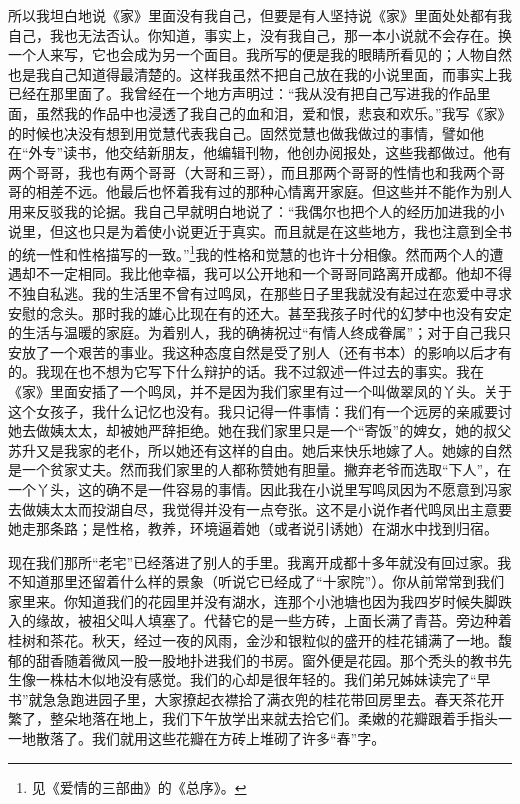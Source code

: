 \par 所以我坦白地说《家》里面没有我自己，但要是有人坚持说《家》里面处处都有我自己，我也无法否认。你知道，事实上，没有我自己，那一本小说就不会存在。换一个人来写，它也会成为另一个面目。我所写的便是我的眼睛所看见的；人物自然也是我自己知道得最清楚的。这样我虽然不把自己放在我的小说里面，而事实上我已经在那里面了。我曾经在一个地方声明过：“我从没有把自己写进我的作品里面，虽然我的作品中也浸透了我自己的血和泪，爱和恨，悲哀和欢乐。”我写《家》的时候也决没有想到用觉慧代表我自己。固然觉慧也做我做过的事情，譬如他在“外专”读书，他交结新朋友，他编辑刊物，他创办阅报处，这些我都做过。他有两个哥哥，我也有两个哥哥（大哥和三哥），而且那两个哥哥的性情也和我两个哥哥的相差不远。他最后也怀着我有过的那种心情离开家庭。但这些并不能作为别人用来反驳我的论据。我自己早就明白地说了：“我偶尔也把个人的经历加进我的小说里，但这也只是为着使小说更近于真实。而且就是在这些地方，我也注意到全书的统一性和性格描写的一致。”\footnote{见《爱情的三部曲》的《总序》。}我的性格和觉慧的也许十分相像。然而两个人的遭遇却不一定相同。我比他幸福，我可以公开地和一个哥哥同路离开成都。他却不得不独自私逃。我的生活里不曾有过鸣凤，在那些日子里我就没有起过在恋爱中寻求安慰的念头。那时我的雄心比现在有的还大。甚至我孩子时代的幻梦中也没有安定的生活与温暖的家庭。为着别人，我的确祷祝过“有情人终成眷属”；对于自己我只安放了一个艰苦的事业。我这种态度自然是受了别人（还有书本）的影响以后才有的。我现在也不想为它写下什么辩护的话。我不过叙述一件过去的事实。我在《家》里面安插了一个鸣凤，并不是因为我们家里有过一个叫做翠凤的丫头。关于这个女孩子，我什么记忆也没有。我只记得一件事情：我们有一个远房的亲戚要讨她去做姨太太，却被她严辞拒绝。她在我们家里只是一个“寄饭”的婢女，她的叔父苏升又是我家的老仆，所以她还有这样的自由。她后来快乐地嫁了人。她嫁的自然是一个贫家丈夫。然而我们家里的人都称赞她有胆量。撇弃老爷而选取“下人”，在一个丫头，这的确不是一件容易的事情。因此我在小说里写鸣凤因为不愿意到冯家去做姨太太而投湖自尽，我觉得并没有一点夸张。这不是小说作者代鸣凤出主意要她走那条路；是性格，教养，环境逼着她（或者说引诱她）在湖水中找到归宿。
\par 现在我们那所“老宅”已经落进了别人的手里。我离开成都十多年就没有回过家。我不知道那里还留着什么样的景象（听说它已经成了“十家院”）。你从前常常到我们家里来。你知道我们的花园里并没有湖水，连那个小池塘也因为我四岁时候失脚跌入的缘故，被祖父叫人填塞了。代替它的是一些方砖，上面长满了青苔。旁边种着桂树和茶花。秋天，经过一夜的风雨，金沙和银粒似的盛开的桂花铺满了一地。馥郁的甜香随着微风一股一股地扑进我们的书房。窗外便是花园。那个秃头的教书先生像一株枯木似地没有感觉。我们的心却是很年轻的。我们弟兄姊妹读完了“早书”就急急跑进园子里，大家撩起衣襟拾了满衣兜的桂花带回房里去。春天茶花开繁了，整朵地落在地上，我们下午放学出来就去拾它们。柔嫩的花瓣跟着手指头一一地散落了。我们就用这些花瓣在方砖上堆砌了许多“春”字。
